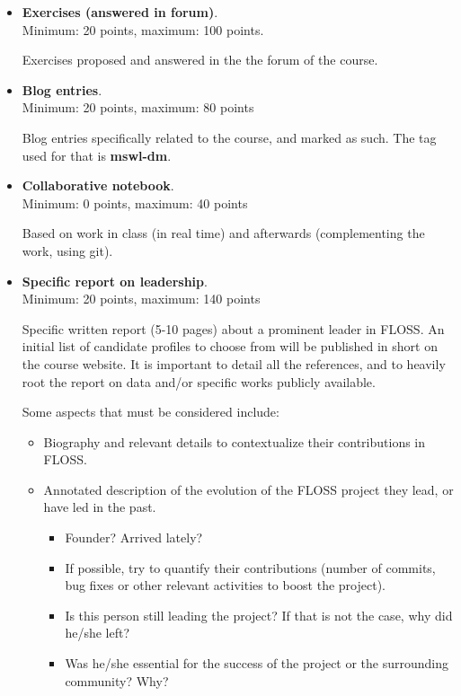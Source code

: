 \documentclass[a4paper]{article}
\begin{document}
\begin{itemize}
\item \textbf{Exercises (answered in forum)}. \\
  Minimum: 20 points, maximum: 100 points.

  Exercises proposed and answered in the the forum of the course.

\item \textbf{Blog entries}. \\
  Minimum: 20 points, maximum: 80 points

  Blog entries specifically related to the course, and marked as such. The tag used for that is \textbf{mswl-dm}.

\item \textbf{Collaborative notebook}. \\
  Minimum: 0 points, maximum: 40 points

  Based on work in class (in real time) and afterwards (complementing the work, using git).

\item \textbf{Specific report on leadership}. \\
  Minimum: 20 points, maximum: 140 points

  Specific written report (5-10 pages) about a prominent leader in FLOSS. An initial list of candidate profiles to choose
from will be published in short on the course website. It is important to detail all the references, and to 
heavily root the report on data and/or specific works publicly available.

  Some aspects that must be considered include:
  \begin{itemize}
   \item Biography and relevant details to contextualize their contributions in FLOSS.
   \item Annotated description of the evolution of the FLOSS project they lead, or have led in the past.
   \begin{itemize}
    \item Founder? Arrived lately?
    \item If possible, try to quantify their contributions (number of commits, bug fixes or other relevant 
    activities to boost the project).
    \item Is this person still leading the project? If that is not the case, why did he/she left?
    \item Was he/she essential for the success of the project or the surrounding community? Why?
   \end{itemize}


\end{itemize}
\end{itemize}
\end{document}
